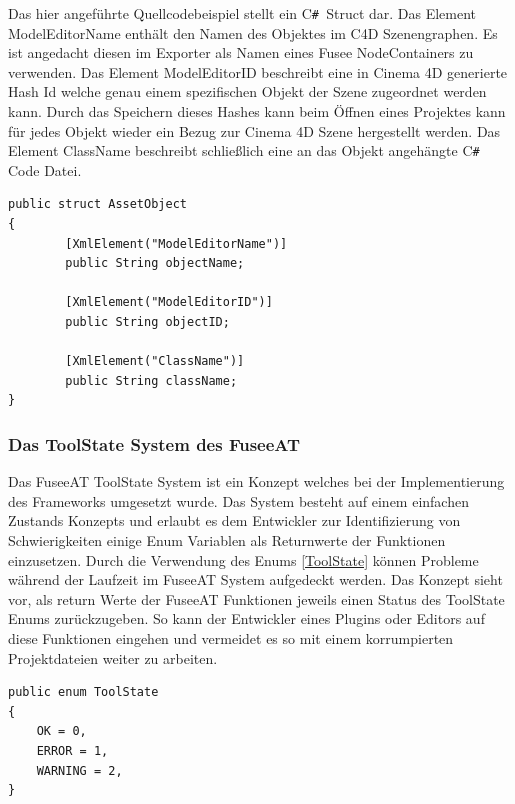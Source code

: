 \documentclass[pagesize, paper=a4, fontsize=12pt, titlepage=true, headings=small, headnosepline, abstractoff, liststotoc, nochapterprefix, plainheadsepline, twoside]{scrreprt}
\newcommand{\CSS}{C\texttt{\# }}
\begin{document}
Das hier angeführte Quellcodebeispiel stellt ein \CSS Struct dar. Das Element ModelEditorName enthält den Namen des Objektes im C4D Szenengraphen. Es ist angedacht diesen im Exporter als Namen eines Fusee NodeContainers zu verwenden. Das Element ModelEditorID beschreibt eine in Cinema 4D generierte Hash Id welche genau einem spezifischen Objekt der Szene zugeordnet werden kann. Durch das Speichern dieses Hashes kann beim Öffnen eines Projektes kann für jedes Objekt wieder ein Bezug zur Cinema 4D Szene hergestellt werden. Das Element ClassName beschreibt schließlich eine an das Objekt angehängte \CSS Code Datei.
\begin{lstlisting}[label=ToolState, caption=Asset Informationsspeicher Objekt. Kann zu XML serialisiert werden.]
public struct AssetObject
{
        [XmlElement("ModelEditorName")]
        public String objectName;

        [XmlElement("ModelEditorID")]
        public String objectID;

        [XmlElement("ClassName")]
        public String className; 
}
\end{lstlisting}

\subsubsection{Das ToolState System des FuseeAT}
Das FuseeAT ToolState System ist ein Konzept welches bei der Implementierung des Frameworks umgesetzt wurde. Das System besteht auf einem einfachen Zustands Konzepts und erlaubt es dem Entwickler zur Identifizierung von Schwierigkeiten einige Enum Variablen als Returnwerte der Funktionen einzusetzen. Durch die Verwendung des Enums \ref{ToolState} können Probleme während der Laufzeit im FuseeAT System aufgedeckt werden. Das Konzept sieht vor, als return Werte der FuseeAT Funktionen jeweils einen Status des ToolState Enums zurückzugeben. So kann der Entwickler eines Plugins oder Editors auf diese Funktionen eingehen und vermeidet es so mit einem korrumpierten Projektdateien weiter zu arbeiten.
\begin{lstlisting}[label=ToolState, caption=ToolState System: Unterstützt die Stabilität des FuseeAT bei der Zusammenarbeit mit Plugins.]
public enum ToolState
{
	OK = 0,
	ERROR = 1,
	WARNING = 2,
}
\end{lstlisting}
\end{document}
